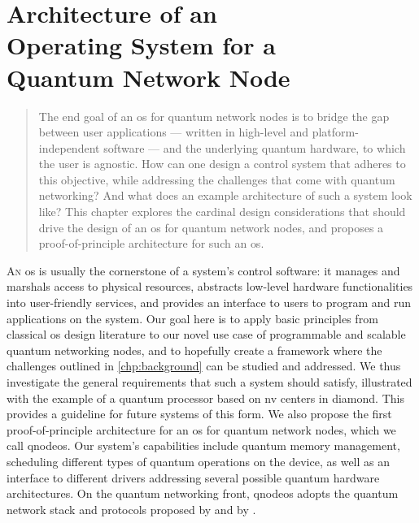 \chapter
 [Architecture of an Operating System for a Quantum Network Node]
 {Architecture of an\\Operating System for a\\Quantum Network Node}
\label{chp:arch}

\begin{abstract}
The end goal of an \acrfull{os} for quantum network nodes is to bridge the gap between user
applications --- written in high-level and platform-independent software --- and the underlying
quantum hardware, to which the user is agnostic. How can one design a control system that adheres to
this objective, while addressing the challenges that come with quantum networking? And what does an
example architecture of such a system look like? This chapter explores the cardinal design
considerations that should drive the design of an \acrshort{os} for quantum network nodes, and
proposes a proof-of-principle architecture for such an \acrshort{os}.
\end{abstract}

\noindent
{}


\newpage

\lettrine{A}{n} \acrfull{os} is usually the cornerstone of a system's control software: it manages
and marshals access to physical resources, abstracts low-level hardware functionalities into
user-friendly services, and provides an interface to users to program and run applications on the
system. Our goal here is to apply basic principles from classical \acrshort{os} design literature to
our novel use case of programmable and scalable quantum networking nodes, and to hopefully create a
framework where the challenges outlined in \cref{chp:background} can be studied and addressed. We
thus investigate the general requirements that such a system should satisfy, illustrated with the
example of a quantum processor based on \acrfull{nv} centers in diamond. This provides a guideline
for future systems of this form. We also propose the first proof-of-principle architecture for an
\acrlong{os} for quantum network nodes, which we call \acrshort{qnodeos}. Our system's capabilities
include quantum memory management, scheduling different types of quantum operations on the device,
as well as an interface to different drivers addressing several possible quantum hardware
architectures. On the quantum networking front, \acrshort{qnodeos} adopts the quantum network stack
and protocols proposed by \textcite{dahlberg_2019_egp} and by \textcite{kozlowski_2020_qnp}.

